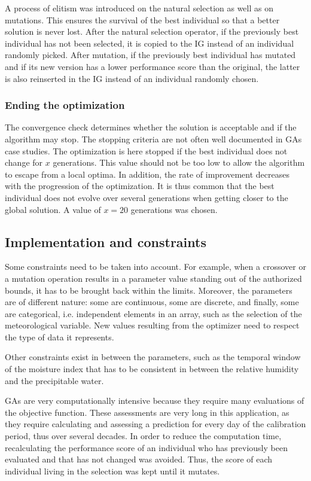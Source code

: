 \documentclass{ametsoc}
\begin{document}
A process of elitism was introduced on the natural selection as well as on mutations. This ensures the survival of the best individual so that a better solution is never lost. After the natural selection operator, if the previously best individual has not been selected, it is copied to the IG instead of an individual randomly picked. After mutation, if the previously best individual has mutated and if its new version has a lower performance score than the original, the latter is also reinserted in the IG instead of an individual randomly chosen.


\subsubsection{Ending the optimization}

The convergence check determines whether the solution is acceptable and if the algorithm may stop. The stopping criteria are not often well documented in GAs case studies. The optimization is here stopped if the best individual does not change for $x$ generations. This value should not be too low to allow the algorithm to escape from a local optima. In addition, the rate of improvement decreases with the progression of the optimization. It is thus common that the best individual does not evolve over several generations when getting closer to the global solution. A value of $x=20$ generations was chosen.


\subsection{Implementation and constraints}

Some constraints need to be taken into account. For example, when a crossover or a mutation operation results in a parameter value standing out of the authorized bounds, it has to be brought back within the limits. Moreover, the parameters are of different nature: some are continuous, some are discrete, and finally, some are categorical, i.e. independent elements in an array, such as the selection of the meteorological variable. New values resulting from the optimizer need to respect the type of data it represents.

Other constraints exist in between the parameters, such as the temporal window of the moisture index \cite[see][]{Horton2016} that has to be consistent in between the relative humidity and the precipitable water.

GAs are very computationally intensive because they require many evaluations of the objective function. These assessments are very long in this application, as they require calculating and assessing a prediction for every day of the calibration period, thus over several decades. In order to reduce the computation time, recalculating the performance score of an individual who has previously been evaluated and that has not changed was avoided. Thus, the score of each individual living in the selection was kept until it mutates.
\end{document}
